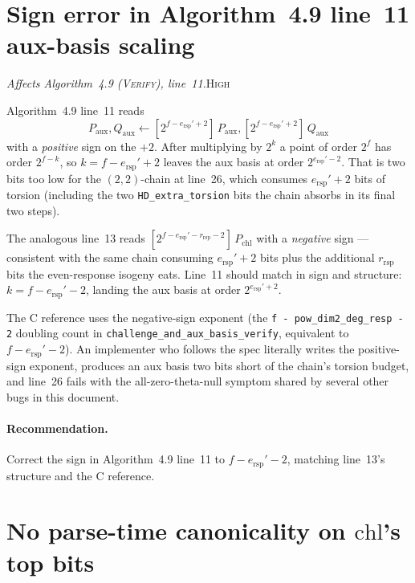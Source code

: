 \documentclass[a4paper,11pt]{article}
\newcommand{\algo}[1]{Algorithm~#1}
\newcommand{\high}{\textsc{\color{BurntOrange}High}}
\newcommand{\finding}[2]{\noindent\textit{#1}\hfill#2\par\smallskip}
\begin{document}
\section{Sign error in \algo{4.9} line~11 aux-basis scaling}
\label{sec:alg49-line11-sign}

\finding{Affects \algo{4.9} (\textsc{Verify}), line~11.}{\high}

\algo{4.9} line~11 reads
\[
  P_{\mathrm{aux}}, Q_{\mathrm{aux}}
    \leftarrow [2^{f - e_{\mathrm{rsp}}' + 2}]\,P_{\mathrm{aux}},
               [2^{f - e_{\mathrm{rsp}}' + 2}]\,Q_{\mathrm{aux}}
\]
with a \emph{positive} sign on the $+2$.  After multiplying by
$2^{k}$ a point of order $2^{f}$ has order $2^{f - k}$, so
$k = f - e_{\mathrm{rsp}}' + 2$ leaves the aux basis at order
$2^{e_{\mathrm{rsp}}' - 2}$.  That is two bits too low for the
$(2,2)$-chain at line~26, which consumes
$e_{\mathrm{rsp}}' + 2$ bits of torsion (including the two
\texttt{HD\_extra\_torsion} bits the chain absorbs in its final
two steps).

The analogous line~13 reads
$[2^{f - e_{\mathrm{rsp}}' - r_{\mathrm{rsp}} - 2}]\,P_{\mathrm{chl}}$
with a \emph{negative} sign — consistent with the same chain
consuming $e_{\mathrm{rsp}}' + 2$ bits plus the additional
$r_{\mathrm{rsp}}$ bits the even-response isogeny eats.  Line~11
should match in sign and structure: $k = f - e_{\mathrm{rsp}}' - 2$,
landing the aux basis at order $2^{e_{\mathrm{rsp}}' + 2}$.

The C reference uses the negative-sign exponent (the
\texttt{f - pow\_dim2\_deg\_resp - 2} doubling count in
\texttt{challenge\_and\_aux\_basis\_verify}, equivalent to
$f - e_{\mathrm{rsp}}' - 2$).  An implementer who follows the
spec literally writes the positive-sign exponent, produces an
aux basis two bits short of the chain's torsion budget, and
line~26 fails with the all-zero-theta-null symptom shared by
several other bugs in this document.

\paragraph{Recommendation.}  Correct the sign in \algo{4.9}
line~11 to $f - e_{\mathrm{rsp}}' - 2$, matching line~13's
structure and the C reference.

\section{No parse-time canonicality on $\mathrm{chl}$'s top bits}
\label{sec:chl-canonicality}
\end{document}
